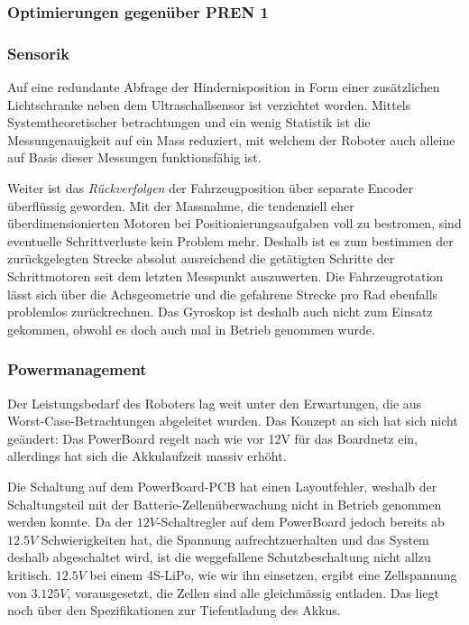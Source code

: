 \documentclass[main.tex]{subfiles} %
\begin{document}

\subsubsection{Optimierungen gegenüber PREN 1}

\subsubsection*{Sensorik}

Auf eine redundante Abfrage der Hindernisposition in Form einer zusätzlichen
Lichtschranke neben dem Ultraschallsensor ist verzichtet worden. Mittels
Systemtheoretischer betrachtungen und ein wenig Statistik ist die
Messungenauigkeit auf ein Mass reduziert, mit welchem der Roboter auch alleine
auf Basis dieser Messungen funktionsfähig ist.

Weiter ist das \textit{Rückverfolgen} der Fahrzeugposition über separate
Encoder überflüssig geworden. Mit der Massnahme, die tendenziell eher
überdimensionierten Motoren bei Positionierungsaufgaben voll zu bestromen, sind
eventuelle Schrittverluste kein Problem mehr. Deshalb ist es zum bestimmen der
zurückgelegten Strecke absolut ausreichend die getätigten Schritte der
Schrittmotoren seit dem letzten Messpunkt auszuwerten. Die Fahrzeugrotation
lässt sich über die Achsgeometrie und die gefahrene Strecke pro Rad ebenfalls
problemlos zurückrechnen. Das Gyroskop ist deshalb auch nicht zum Einsatz
gekommen, obwohl es doch auch mal in Betrieb genommen wurde.

\subsubsection*{Powermanagement}

Der Leistungsbedarf des Roboters lag weit unter den Erwartungen, die aus
Worst-Case-Betrachtungen abgeleitet wurden. Das Konzept an sich hat sich nicht
geändert: Das PowerBoard regelt nach wie vor 12V für das Boardnetz ein,
allerdings hat sich die Akkulaufzeit massiv erhöht.

Die Schaltung auf dem PowerBoard-PCB hat einen Layoutfehler, weshalb der
Schaltungsteil mit der Batterie-Zellenüberwachung nicht in Betrieb genommen
werden konnte. Da der $12V$-Schaltregler auf dem PowerBoard jedoch bereits ab
$12.5V$ Schwierigkeiten hat, die Spannung aufrechtzuerhalten und das System
deshalb abgeschaltet wird, ist die weggefallene Schutzbeschaltung nicht allzu
kritisch. $12.5V$ bei einem 4S-LiPo, wie wir ihn einsetzen, ergibt eine
Zellspannung von $3.125V$, vorausgesetzt, die Zellen sind alle gleichmässig
entladen. Das liegt noch über den Spezifikationen zur Tiefentladung des Akkus.
\end{document}
